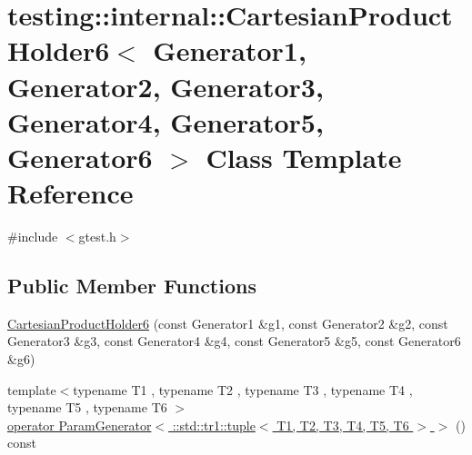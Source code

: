 \hypertarget{classtesting_1_1internal_1_1_cartesian_product_holder6}{\section{testing\-:\-:internal\-:\-:Cartesian\-Product\-Holder6$<$ Generator1, Generator2, Generator3, Generator4, Generator5, Generator6 $>$ Class Template Reference}
\label{classtesting_1_1internal_1_1_cartesian_product_holder6}
}


{\ttfamily \#include $<$gtest.\-h$>$}

\subsection*{Public Member Functions}
\begin{DoxyCompactItemize}
\item 
\hyperlink{classtesting_1_1internal_1_1_cartesian_product_holder6_a7bb6f9224a1a6766e3634eb392e1b5f6}{Cartesian\-Product\-Holder6} (const Generator1 \&g1, const Generator2 \&g2, const Generator3 \&g3, const Generator4 \&g4, const Generator5 \&g5, const Generator6 \&g6)
\item 
{\footnotesize template$<$typename T1 , typename T2 , typename T3 , typename T4 , typename T5 , typename T6 $>$ }\\\hyperlink{classtesting_1_1internal_1_1_cartesian_product_holder6_ad6ebc1f0b150eb882a5b5aaaae5f3a5c}{operator Param\-Generator$<$ \-::std\-::tr1\-::tuple$<$ T1, T2, T3, T4, T5, T6 $>$ $>$} () const 
\end{DoxyCompactItemize}



